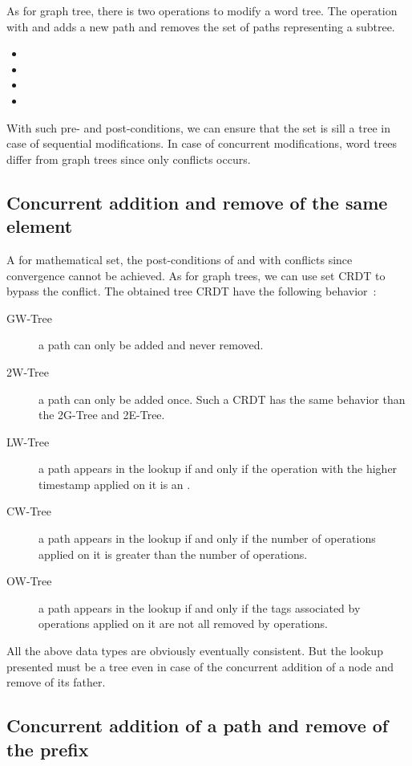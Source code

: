 \documentclass[a4paper]{article}
\begin{document}
As for graph tree, there is two operations to modify a word tree. The
operation  with  and  adds a new path and
 removes the set of paths representing a subtree.
\begin{itemize}
\item 
\item 
\item    
\item 
\end{itemize}

With such pre- and post-conditions, we can ensure that the set  is
sill a tree in case of sequential modifications.  In case of
concurrent modifications, word trees differ from graph trees since
only  conflicts occurs.

\subsection{Concurrent addition and remove of the same element}

A for mathematical set, the post-conditions of  and 
with  conflicts since convergence cannot be achieved. As for
graph trees, we can use set CRDT to bypass the conflict. The obtained
tree CRDT have the following behavior~:


\begin{description}
\item[GW-Tree] a path can only be added and never removed.
\item[2W-Tree] a path can only be added once. Such a CRDT has the same
  behavior than the 2G-Tree and 2E-Tree.
\item[LW-Tree] a path appears in the lookup if and only if the
  operation with the higher timestamp applied on it is an .
\item[CW-Tree] a path appears in the lookup if and only if the number
  of  operations applied on it is greater than the number of
   operations.
\item[OW-Tree] a path appears in the lookup if and only if the tags
  associated by  operations applied on it are not all removed by
   operations.
\end{description}

All the above data types are obviously eventually consistent. But the
lookup presented must be a tree even in case of the concurrent
addition of a node and remove of its father.

\subsection{Concurrent addition of a path and remove of the prefix}
\end{document}
